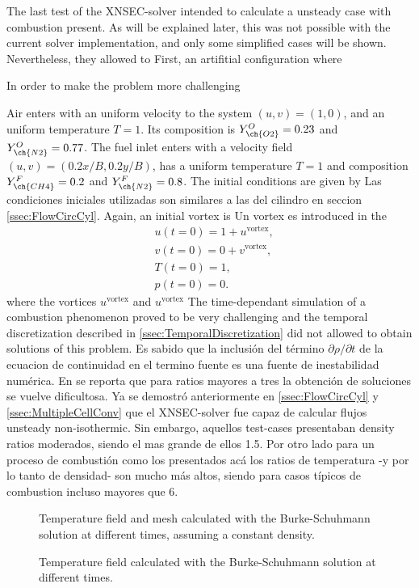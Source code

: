 The last test of the XNSEC-solver intended to calculate a unsteady case with combustion present.  As will be explained later, this was not possible with the current solver implementation, and only some simplified cases will be shown. Nevertheless, they allowed to 
First, an artifitial configuration where 


In order to make the problem more challenging


Air enters with an uniform velocity to the system $(u,v) =(1,0)$, and an uniform temperature $T = 1$. Its composition is $Y^O_{\ch{O2}} = 0.23$ and $Y^O_{\ch{N2}} = 0.77$. The fuel inlet enters with a velocity field $(u,v) = (0.2x/B,0.2y/B)$, has a uniform temperature $T = 1$ and composition $Y^F_{\ch{CH4}} = 0.2$ and $Y^F_{\ch{N2}} = 0.8$. 
The initial conditions are given by 
Las condiciones iniciales utilizadas son similares a las del cilindro en seccion \cref{ssec:FlowCircCyl}. Again, an initial vortex is Un vortex es introduced in the 
\begin{subequations} 
	\begin{align}
		&u(t=0) = 1 + u^{\text{vortex}},  \\
		&v(t=0) = 0 + v^{\text{vortex}},  \\
		&T(t=0) = 1,\\
		&p(t=0) = 0.
	\end{align}
\end{subequations}
where the vortices $u^{\text{vortex}}$ and $u^{\text{vortex}}$
The time-dependant simulation of a combustion phenomenon proved to be very challenging and the temporal discretization described in \cref{ssec:TemporalDiscretization} did not allowed to obtain solutions of this problem. Es sabido que la inclusión del término $\partial \rho /\partial t$ de la ecuacion de continuidad en el termino fuente es una fuente de inestabilidad numérica. En \cite{nicoudNumericalStudyChannel} se reporta que para ratios mayores a tres la obtención de soluciones se vuelve dificultosa. Ya se demostró anteriormente en \cref{ssec:FlowCircCyl} y \cref{ssec:MultipleCellConv} que el XNSEC-solver fue capaz de calcular flujos unsteady non-isothermic. Sin embargo, aquellos test-cases presentaban density ratios moderados, siendo el mas grande de ellos 1.5. Por otro lado para un proceso de combustión como los presentados acá los ratios de temperatura -y por lo tanto de densidad- son mucho más altos, siendo para casos típicos de combustion incluso mayores que 6. 
 
\label{ssec:MultipleCellConv}
\begin{figure}[p]
	\centering
	\caption{Temperature field and mesh calculated with the Burke-Schuhmann solution at different times, assuming a constant density.} \label{fig:CoFlowFlameFig1}
\end{figure}


\begin{figure}[p]
	\centering
	\caption{Temperature field calculated with the Burke-Schuhmann solution at different times.} \label{fig:CoFlowFlameFig1}
\end{figure}

